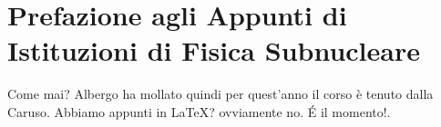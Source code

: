 \chapter{Prefazione agli Appunti di Istituzioni di Fisica Subnucleare}
    Come mai? Albergo ha mollato quindi per quest'anno il corso è tenuto dalla Caruso. Abbiamo appunti in \LaTeX? ovviamente no. \'E il momento!.